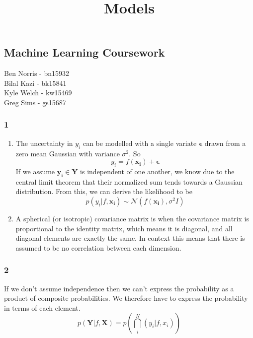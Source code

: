 \documentclass[11pt]{article}
\title{Models}
\begin{document}
    \maketitle


    \subsection*{Machine Learning
Coursework}\label{machine-learning-coursework}

Ben Norris - bn15932\\
Bilal Kazi - bk15841\\
Kyle Welch - kw15469\\
Greg Sims - gs15687

    \subsubsection*{1}\label{section}

\begin{enumerate}
\def\labelenumi{\alph{enumi})}
\item
  The uncertainty in \(y_i\) can be modelled with a single variate
  \(\boldsymbol{\epsilon}\) drawn from a zero mean Gaussian with
  variance \(\sigma^2\). So
  \[y_i = f(\boldsymbol{x_i}) + \boldsymbol{\epsilon}\] If we assume
  \(\boldsymbol{y_i} \in \boldsymbol{Y}\) is independent of one another,
  we know due to the central limit theorem that their normalized sum
  tends towards a Gaussian distribution. From this, we can derive the
  likelihood to be
  \[ p(y_i|f, \boldsymbol{x_i}) \sim \mathcal{N}(f(\boldsymbol{x_i}), \sigma^2I)\]
\item
  A spherical (or isotropic) covariance matrix is when the covariance
  matrix is proportional to the identity matrix, which means it is
  diagonal, and all diagonal elements are exactly the same. In context
  this means that there is assumed to be no correlation between each
  dimension.
\end{enumerate}

    \subsubsection*{2}\label{section}

If we don't assume independence then we can't express the probability as
a product of composite probabilities. We therefore have to express the
probability in terms of each element. \[
p(\mathbf{Y} | f, \mathbf{X}) = p(\bigcap_i^N (y_i | f, x_i))
\]
\end{document}
